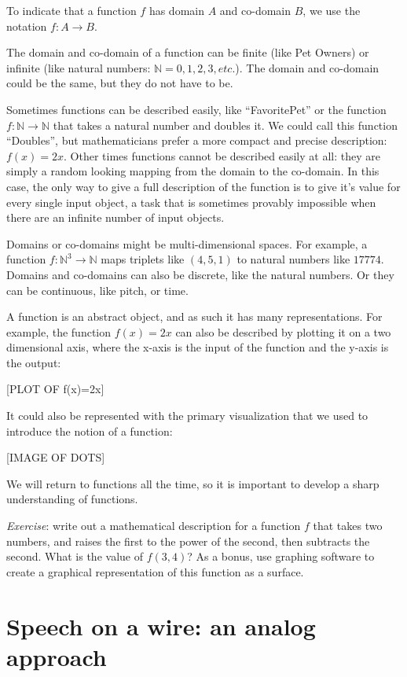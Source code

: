 \documentclass[UTF8]{book}
\begin{document}
\begin{CJK}{UTF8}{gbsn}
To indicate that a function $f$ has domain $A$ and co-domain $B$, we use the notation $f: A \rightarrow B$.

The domain and co-domain of a function can be finite (like Pet Owners) or infinite (like natural numbers: $\mathbb{N} = {0, 1, 2, 3, etc.}$). The domain and co-domain could be the same, but they do not have to be.

Sometimes functions can be described easily, like ``FavoritePet'' or the function $f: \mathbb{N} \rightarrow \mathbb{N}$ that takes a natural number and doubles it. We could call this function ``Doubles'', but mathematicians prefer a more compact and precise description: $f(x) = 2x$. Other times functions cannot be described easily at all: they are simply a random looking mapping from the domain to the co-domain. In this case, the only way to give a full description of the function is to give it's value for every single input object, a task that is sometimes provably impossible when there are an infinite number of input objects.

Domains or co-domains might be multi-dimensional spaces. For example, a function $f: \mathbb{N}^{3} \rightarrow \mathbb{N}$ maps triplets like $(4,5,1)$ to natural numbers like $17774$. Domains and co-domains can also be discrete, like the natural numbers. Or they can be continuous, like pitch, or time.

A function is an abstract object, and as such it has many representations. For example, the function $f(x)=2x$ can also be described by plotting it on a two dimensional axis, where the x-axis is the input of the function and the y-axis is the output:

[PLOT OF f(x)=2x]

It could also be represented with the primary visualization that we used to introduce the notion of a function:

[IMAGE OF DOTS]

We will return to functions all the time, so it is important to develop a sharp understanding of functions.

\emph{Exercise}: write out a mathematical description for a function $f$ that takes two numbers, and raises the first to the power of the second, then subtracts the second. What is the value of $f(3,4)$? As a bonus, use graphing software to create a graphical representation of this function as a surface.

\section{Speech on a wire: an analog approach}


\end{CJK}
\end{document}
